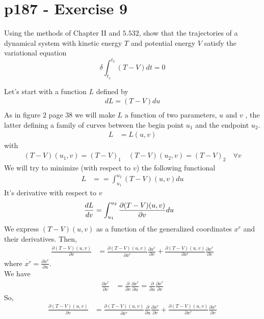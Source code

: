 \section{p187 - Exercise 9}
\begin{tcolorbox}
Using the methods of Chapter II and $\mathbf{5.532}$, show that the trajectories of a dynamical system with kinetic energy $T$ and potential energy $V$ satisfy the variational equation $$\delta \int_{t_1}^{t_2}\left(T-V\right)dt = 0$$
\end{tcolorbox}
Let's start with a function $L$ defined by 
\begin{align}
dL=(T-V)du\\
\end{align}
As in figure $2$ page 38 we will make $L$ a function of two parameters, $u$ and $v$ , the latter defining a family of curves between the begin  point $u_1$ and the endpoint $u_2$.
\begin{align}
L&= L(u,v)
\end{align}
with 
\begin{align}
(T-V)(u_1,v)=(T-V)_1 \quad (T-V)(u_2,v)=(T-V)_2 \quad \forall v  
\end{align}
We will try to minimize (with respect to $v$) the following functional
\begin{align}
L &= = \int_{u_1}^{u_2}(T-V)(u,v)du
\end{align}
It's derivative with respect to $v$
\begin{align}
\dv{L}{v} &= \int_{u_1}^{u_2}\frac{\partial (T-V)(u,v)}{\partial v}du
\end{align}
We express $(T-V)(u,v)$ as a function of the generalized coordinates $x^r$ and their derivatives. Then,
\begin{align}
\frac{\partial (T-V)(u,v)}{\partial v}&= \frac{\partial (T-V)(u,v)}{\partial \dot{x^r}}\frac{\partial \dot{x^r}}{\partial v}+\frac{\partial (T-V)(u,v)}{\partial x^r}\frac{\partial x^r}{\partial v}
\end{align}
where $\dot{x^r}= \frac{\partial x^r}{\partial u}$.\\
We have 
\begin{align}
\frac{\partial \dot{x^r}}{\partial v} &= \frac{\partial}{\partial v} \frac{\partial x^r}{\partial u}= \frac{\partial}{ \partial u} \frac{\partial x^r}{\partial v}
\end{align}
So, 
\begin{align}
\frac{\partial (T-V)(u,v)}{\partial v}&= \frac{\partial (T-V)(u,v)}{\partial \dot{x^r}}\frac{\partial}{ \partial u} \frac{\partial x^r}{\partial v}+\frac{\partial (T-V)(u,v)}{\partial x^r}\frac{\partial x^r}{\partial v}
\end{align}
